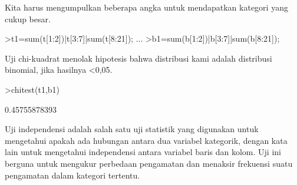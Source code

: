 \documentclass[a4paper,10pt]{article}
\begin{document}
\begin{eulernotebook}
\begin{eulercomment}
\begin{eulercomment}
\begin{eulercomment}
\begin{eulercomment}
\begin{eulercomment}
\begin{eulercomment}
\begin{eulercomment}
\begin{eulercomment}
\begin{eulercomment}
\begin{eulercomment}
\begin{eulercomment}
\begin{eulercomment}
\begin{eulercomment}
\begin{eulercomment}
\begin{eulercomment}
\begin{eulercomment}
\begin{eulercomment}
\begin{eulercomment}
\begin{eulercomment}
\begin{eulercomment}
\begin{eulerprompt}
\end{eulerprompt}
\begin{eulercomment}
Kita harus mengumpulkan beberapa angka untuk mendapatkan kategori yang
cukup besar.
\end{eulercomment}
\begin{eulerprompt}
>t1=sum(t[1:2])|t[3:7]|sum(t[8:21]); ...
>b1=sum(b[1:2])|b[3:7]|sum(b[8:21]);
\end{eulerprompt}
\begin{eulercomment}
Uji chi-kuadrat menolak hipotesis bahwa distribusi kami adalah
distribusi binomial, jika hasilnya \textless{}0,05.
\end{eulercomment}
\begin{eulerprompt}
>chitest(t1,b1)
\end{eulerprompt}
\begin{euleroutput}
  0.45755878393
\end{euleroutput}
\begin{eulercomment}
Uji independensi adalah salah satu uji statistik yang digunakan untuk
mengetahui apakah ada hubungan antara dua variabel kategorik, dengan
kata lain untuk mengetahui independensi antara variabel baris dan
kolom. Uji ini berguna untuk mengukur perbedaan pengamatan dan
menaksir frekuensi suatu pengamatan dalam kategori tertentu.


\end{eulercomment}
\end{eulercomment}
\end{eulercomment}
\end{eulercomment}
\end{eulercomment}
\end{eulercomment}
\end{eulercomment}
\end{eulercomment}
\end{eulercomment}
\end{eulercomment}
\end{eulercomment}
\end{eulercomment}
\end{eulercomment}
\end{eulercomment}
\end{eulercomment}
\end{eulercomment}
\end{eulercomment}
\end{eulercomment}
\end{eulercomment}
\end{eulercomment}
\end{eulercomment}
\end{eulernotebook}
\end{document}
